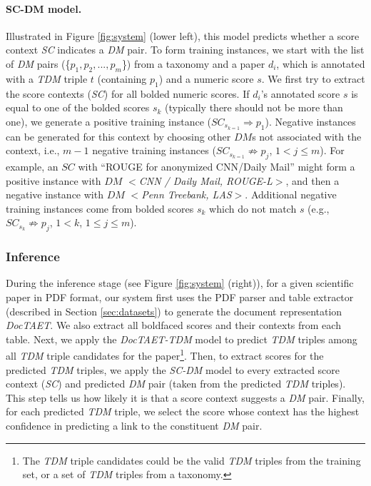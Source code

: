 \documentclass[11pt,a4paper]{article}
\begin{document}
\paragraph{SC-DM model.} Illustrated in Figure \ref{fig:system} (lower left), this model predicts whether a score context \emph{SC} indicates a \emph{DM} pair. 
To form training instances, we start with the list of \emph{DM} pairs (\{$p_1, p_2, ..., p_m$\}) from a taxonomy and a paper $d_i$,  which is annotated with a \emph{TDM} triple $t$ (containing  $p_1$) and a numeric score $s$. We first try to extract the score contexts (\emph{SC}) for all bolded numeric scores. If $d_i$'s annotated score $s$ is equal to one of the bolded scores $s_k$ (typically there should not be more than one), we generate a positive training instance ($SC_{s_{k=1}} \Rightarrow p_1$).  Negative instances can be generated for this context by choosing other $DM$s not associated with the context, i.e.,  $m-1$ negative training instances ($SC_{s_{k=1}} \not \Rightarrow p_j$, $1<j \leq m$).
For example, an $SC$ with ``ROUGE for anonymized CNN/Daily Mail'' might form a positive instance with $DM$ $<$\emph{CNN / Daily Mail, ROUGE-L}$>$, and then a negative instance with $DM$ $<$\emph{Penn Treebank, LAS}$>$.
Additional negative training instances come from bolded scores $s_k$ which do not match $s$ (e.g., $SC_{s_k} \not \Rightarrow p_j$, $1< k$, $1 \leq j \leq m$). 

\subsubsection{Inference}
During the inference stage (see Figure \ref{fig:system} (right)), for a given scientific paper
in PDF format, our system first uses the PDF parser and table extractor (described in Section \ref{sec:datasets}) to generate the document representation \emph{DocTAET}. We also extract all boldfaced scores and their contexts from each table. Next, we apply the \emph{DocTAET-TDM} model to predict \emph{TDM} triples among all \emph{TDM}  triple candidates for the paper\footnote{The \emph{TDM} triple candidates could be the valid \emph{TDM}  triples from the training set, or a set of \emph{TDM} triples from a taxonomy.}. Then, to extract scores for the predicted \emph{TDM} triples, we apply the \emph{SC-DM} model to every extracted score context (\emph{SC}) and predicted \emph{DM} pair (taken from the predicted \emph{TDM} triples). This step tells us how likely it is that a score context suggests a \emph{DM} pair. Finally, for each predicted \emph{TDM} triple, we select the score whose context has the highest confidence in predicting a link to the constituent \emph{DM} pair.
\end{document}
